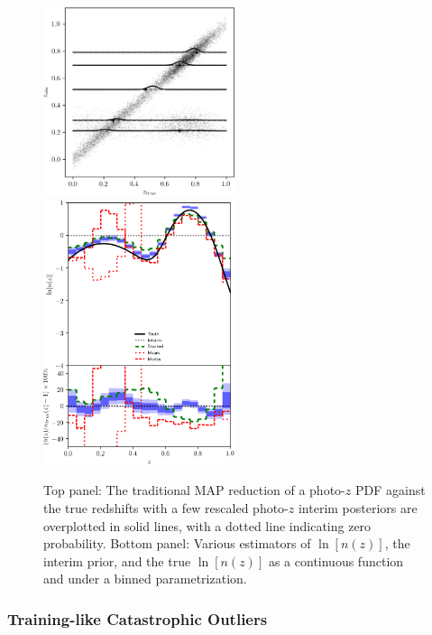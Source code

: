 \documentclass[iop]{emulateapj}
\begin{document}
\begin{figure}
	\begin{center}
		\includegraphics[width=0.5\textwidth]{fig/template_outliers/scatter.png}\\
		\includegraphics[width=0.5\textwidth]{fig/template_outliers/estimators.png}		
		\caption{Top panel: The traditional MAP reduction of a photo-$z$ PDF against the true redshifts with a few rescaled photo-$z$ interim posteriors are overplotted in solid lines, with a dotted line indicating zero probability.  Bottom panel: Various estimators of $\ln[n(z)]$, the interim prior, and the true $\ln[n(z)]$ as a continuous function and under a binned parametrization.}
		\label{fig:tempcatout}
	\end{center}
\end{figure}

\subsubsection{Training-like Catastrophic Outliers}
\label{sec:traincatout}
\end{document}
